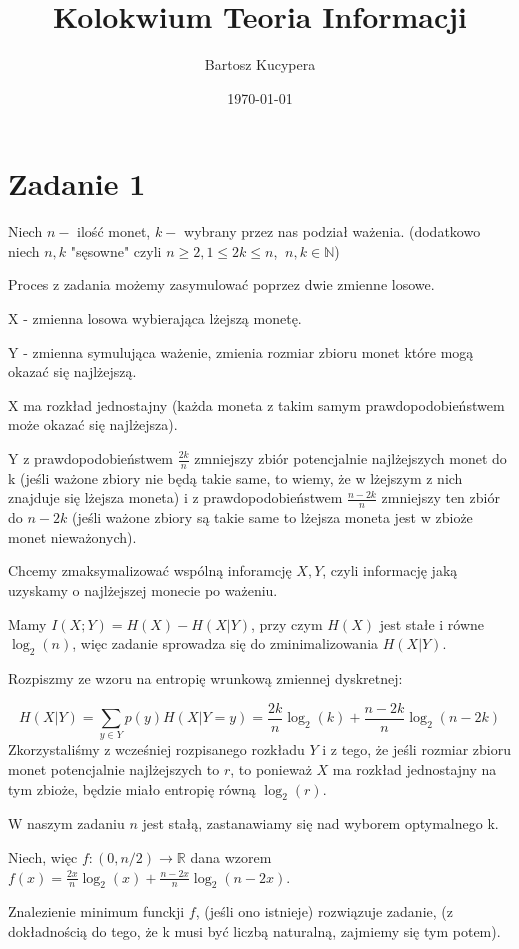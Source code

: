 \documentclass{article}
\title{Kolokwium Teoria Informacji}
\author{Bartosz Kucypera}
\date{\today}
\begin{document}
\maketitle

\section*{Zadanie 1}
Niech $n-$ ilość monet, $k-$ wybrany przez nas podział ważenia. \newline
(dodatkowo niech $n,k$ "sęsowne" czyli $n \ge 2, 1\le 2k\le n$,  $\:n,k \in \mathbb{N}$)

Proces z zadania możemy zasymulować poprzez dwie zmienne losowe.

X - zmienna losowa wybierająca lżejszą monetę.

Y - zmienna symulująca ważenie, zmienia rozmiar zbioru monet które mogą okazać się najlżejszą.

X ma rozkład jednostajny (każda moneta z takim samym prawdopodobieństwem może okazać się najlżejsza).

Y z prawdopodobieństwem $\frac{2k}{n}$ zmniejszy zbiór potencjalnie najlżejszych monet do k (jeśli ważone zbiory nie będą takie same, to wiemy, że w lżejszym z nich znajduje się lżejsza moneta) i z prawdopodobieństwem $\frac{n - 2k}{n}$ zmniejszy ten zbiór do $n-2k$ (jeśli ważone zbiory są takie same to lżejsza moneta jest w zbioże monet nieważonych).

Chcemy zmaksymalizować wspólną inforamcję $X, Y$, czyli informację jaką uzyskamy o najlżejszej monecie po ważeniu.

Mamy $I(X;Y)=H(X) - H(X|Y)$, przy czym $H(X)$ jest stałe i równe $\log_2(n)$, więc zadanie sprowadza się do zminimalizowania $H(X|Y)$.

Rozpiszmy ze wzoru na entropię wrunkową zmiennej dyskretnej:

$$H(X|Y) = \sum_{y \in Y}p(y)H(X|Y=y) = \frac{2k}{n} \log_2(k) + \frac{n- 2k}{n} \log_2(n-2k)$$
Zkorzystaliśmy z wcześniej rozpisanego rozkładu $Y$ i z tego, że jeśli rozmiar zbioru monet potencjalnie najlżejszych to $r$, to ponieważ $X$ ma rozkład jednostajny na tym zbioże, będzie miało entropię równą $\log_2(r)$.

W naszym zadaniu $n$ jest stałą, zastanawiamy się nad wyborem optymalnego k.

Niech, więc $f: (0, n/2) \to \mathbb{R}$ dana wzorem $f(x) = \frac{2x}{n}\log_2(x)+\frac{n-2x}{n}\log_2(n-2x)$.

Znalezienie minimum funckji $f$, (jeśli ono istnieje) rozwiązuje zadanie, (z dokładnością do tego, że k musi być liczbą naturalną, zajmiemy się tym potem).
\end{document}
